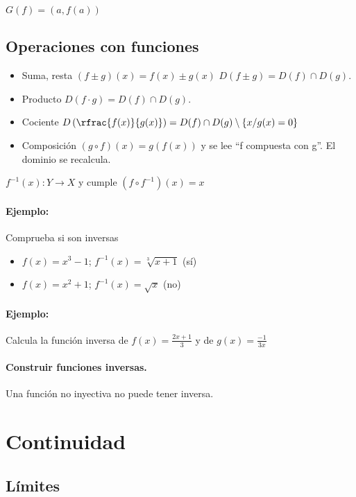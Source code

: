  $G(f) = {\left(a,f(a)\right)}$

\subsection{Operaciones con funciones}
\begin{itemize}
	\item Suma, resta $(f\pm g)(x) = f(x) \pm g(x)$
	\subitem $D(f\pm g) = D(f)\cap D(g)$.
	\item Producto
	\subitem $D(f·g) = D(f)\cap D(g)$.
	\item Cociente 
	\subitem $D\left(\rfrac{f(x)}{g(x)}\right) = D(f)\cap D(g) \setminus \{x/g(x) = 0\}$
	\item Composición $(g\circ f)(x) = g\left(f(x)\right)$ y se lee ``f compuesta con g''.
	\subitem El dominio se recalcula.
\end{itemize}

 $f^{-1}(x):Y\to X$ y cumple $(f\circ f^{-1})(x) = x$

\paragraph{Ejemplo:} Comprueba si son inversas
\begin{itemize}
	\item $f(x) = x^3-1$; $f^{-1}(x) = \sqrt[3]{x+1}$ (sí)
	\item $f(x) = x^2+1$; $f^{-1}(x) = \sqrt{x}$ (no)
\end{itemize}

\paragraph{Ejemplo:} Calcula la función inversa de $f(x) = \frac{2x+1}{3}$ y de $g(x) = \frac{-1}{3x}$ 

\paragraph{Construir funciones inversas.}

\obs Una función no inyectiva no puede tener inversa.

\section{Continuidad}
\subsection{Límites}

